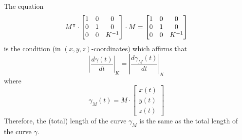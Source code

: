 \documentclass[newpage,hints,handout,noauthor,nooutcomes,12pt]{ximera}
\begin{document}
The equation
\[
    M^\intercal \cdot\begin{bmatrix}
    1 & 0 & 0\\
    0 & 1 & 0\\
    0 & 0 & K^{-1}
    \end{bmatrix}
    \cdot M=\begin{bmatrix}
    1 & 0 & 0\\
    0 & 1 & 0\\
    0 & 0 & K^{-1}
    \end{bmatrix}
    \]
is the condition (in $(x,y,z)$-coordinates) which affirms that
\[
\left|\frac{d\gamma(t)}{dt}\right|_K =\left|\frac{d\gamma_M(t)}{dt}\right|_K
\]
where
\[
\gamma_M(t) = M \cdot
\begin{bmatrix}
  x(t) \\ y(t) \\ z(t)
\end{bmatrix}
\]
Therefore, the (total) length of the curve $\gamma_M$ is the same as
the total length of the curve $\gamma$.


\end{document}
